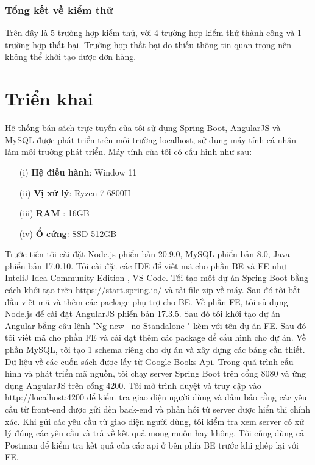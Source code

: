 \documentclass[../DoAn.tex]{subfiles}
\begin{document}
\subsubsection{Tổng kết về kiểm thử}
Trên đây là 5 trường hợp kiểm thử, với 4 trường hợp kiểm thử thành công và 1 trường hợp thất bại. Trường hợp thất bại do thiếu thông tin quan trọng nên không thể khởi tạo được đơn hàng.

\section{Triển khai}

Hệ thống bán sách trực tuyến của tôi sử dụng Spring Boot, AngularJS và MySQL được phát triển trên môi trường localhost, sử dụng máy tính cá nhân làm môi trường phát triển. Máy tính của tôi có cấu hình như sau:
\begin{enumerate}
    \item[(i)] \textbf{Hệ điều hành}: Window 11
    \item[(ii)] \textbf{Vị xử lý}: Ryzen 7 6800H
    \item[(iii)] \textbf{RAM} : 16GB
    \item[(iv)] \textbf{Ổ cứng}: SSD 512GB 
\end{enumerate}
Trước tiên tôi cài đặt Node.js phiển bản 20.9.0, MySQL phiển bản 8.0, Java phiển bản 17.0.10. Tôi cài đặt các IDE để viết mã cho phần BE và FE như InteliJ Idea Community Edition , VS Code.
Tổi tạo một dự án Spring Boot bằng cách khởi tạo trên \url{https://start.spring.io/} và tải file zip về máy. Sau đó tôi bắt đầu viết mã và thêm các package phụ trợ cho BE.
Về phần FE, tôi sủ dụng Node.js để cài đặt AngularJS phiển bản 17.3.5. Sau đó tôi khởi tạo dự án  Angular bằng câu lệnh "Ng new --no-Standalone " kèm với tên dự án FE. Sau đó tôi viết mã cho phần FE và cài đặt thêm các package để cấu hình cho dự án.
Về phần MySQL, tôi tạo 1 schema riêng cho dự án và xây dựng các bảng cần thiết. Dữ liệu về các cuốn sách được lấy từ Google Books Api. 
Trong quá trình cấu hình và phát triển mã nguồn, tôi chạy server Spring Boot  trên cổng 8080 và ứng dụng AngularJS trên cổng 4200. Tôi mở trình duyệt và truy cập vào http://localhost:4200 để kiểm tra giao diện người dùng và đảm bảo rằng các yêu cầu từ front-end được gửi đến back-end và phản hồi từ server được hiển thị chính xác. Khi gửi các yêu cầu từ giao diện người dùng, tôi kiểm tra xem server có xử lý đúng các yêu cầu và trả về kết quả mong muốn hay không. Tôi cũng dùng cả Postman để kiểm tra kết quả của các api ở bên phía BE trước khi ghép lại với FE.
\end{document}
